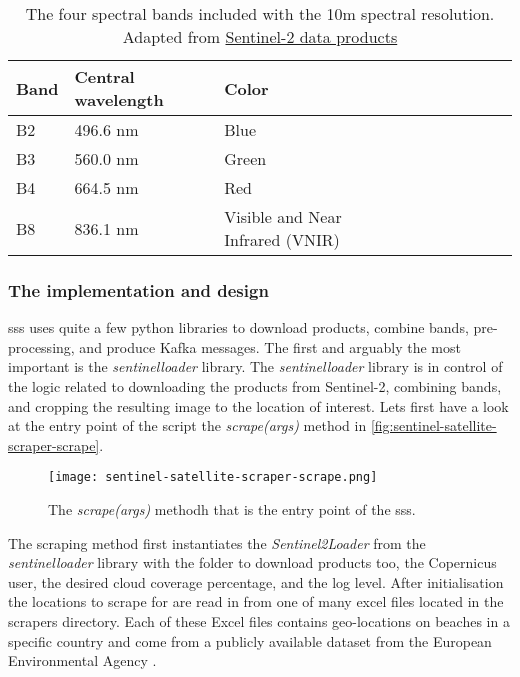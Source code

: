 \begin{table}[h!]
    \centering
    \begin{tabular}{| p{0.1\linewidth} | p{0.3\linewidth} | p{0.3\linewidth} | p{0.3\linewidth} |}
        \hline
        \textbf{Band} & \textbf{Central wavelength} & \textbf{Color}                   \\ \hline
        B2            & 496.6 nm                    & Blue                             \\ \hline
        B3            & 560.0 nm                    & Green                            \\ \hline
        B4            & 664.5 nm                    & Red                              \\ \hline
        B8            & 836.1 nm                    & Visible and Near Infrared (VNIR) \\ \hline
    \end{tabular}
    \caption{The four spectral bands included with the 10m spectral resolution. Adapted from \href{https://sentinels.copernicus.eu/web/sentinel/missions/sentinel-2/data-products}{Sentinel-2 data products}}
    \label{tab:sentinel-2-10m-bands}
\end{table}

\subsubsection{The implementation and design}

\acrshort{sss} uses quite a few python libraries to download products, combine bands, pre-processing, and produce Kafka messages. The first and arguably the most important is the \emph{sentinelloader} library. The \emph{sentinelloader} library is in control of the logic related to downloading the products from Sentinel-2, combining bands, and cropping the resulting image to the location of interest. Lets first have a look at the entry point of the script the \emph{scrape(args)} method in \autoref{fig:sentinel-satellite-scraper-scrape}.

\begin{figure}[h!]
    \centering
    \texttt{[image: sentinel-satellite-scraper-scrape.png]}
    \caption{The \emph{scrape(args)} methodh that is the entry point of the \acrshort{sss}.}
    \label{fig:sentinel-satellite-scraper-scrape}
\end{figure}

The scraping method first instantiates the \emph{Sentinel2Loader} from the \emph{sentinelloader} library with the folder to download products too, the Copernicus user, the desired cloud coverage percentage, and the log level. After initialisation the locations to scrape for are read in from one of many excel files located in the scrapers directory. Each of these Excel files contains geo-locations on beaches in a specific country and come from a publicly available dataset from the European Environmental Agency \cite{bathing_dateset}. 


